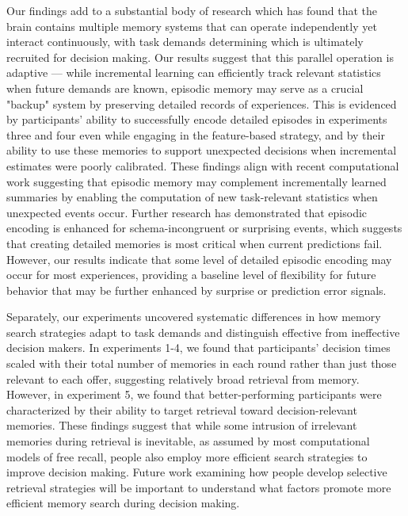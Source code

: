 \documentclass[10pt,letterpaper]{article}
\begin{document}
Our findings add to a substantial body of research which has found that the brain contains multiple memory systems that can operate independently yet interact continuously\cite{packardInactivationHippocampusCaudate1996, squireStructureFunctionDeclarative1996, poldrackCompetitionMultipleMemory2003, poldrackInteractiveMemorySystems2001, shohamyHabitsReinforcementLearning2014, montaser-kouhsariTwoRoutesValuebased2024}, with task demands determining which is ultimately recruited for decision making\cite{dawUncertaintybasedCompetitionPrefrontal2005, nicholasUncertaintyAltersBalance2022, leeNeuralComputationsUnderlying2014}. Our results suggest that this parallel operation is adaptive --- while incremental learning can efficiently track relevant statistics when future demands are known, episodic memory may serve as a crucial "backup" system by preserving detailed records of experiences. This is evidenced by participants' ability to successfully encode detailed episodes in experiments three and four even while engaging in the feature-based strategy, and by their ability to use these memories to support unexpected decisions when incremental estimates were poorly calibrated. These findings align with recent computational work\cite{nagyInterplayEpisodicSemantic2025} suggesting that episodic memory may complement incrementally learned summaries by enabling the computation of new task-relevant statistics when unexpected events occur. Further research has demonstrated that episodic encoding is enhanced for schema-incongruent or surprising events\cite{greveKnowledgePowerPrior2019, vankesterenHowSchemaNovelty2012}, which suggests that creating detailed memories is most critical when current predictions fail. However, our results indicate that some level of detailed episodic encoding may occur for most experiences, providing a baseline level of flexibility for future behavior that may be further enhanced by surprise or prediction error signals\cite{rouhaniSignedUnsignedReward2021, jangPositiveRewardPrediction2019}.

Separately, our experiments uncovered systematic differences in how memory search strategies adapt to task demands and distinguish effective from ineffective decision makers. In experiments 1-4, we found that participants' decision times scaled with their total number of memories in each round rather than just those relevant to each offer, suggesting relatively broad retrieval from memory. However, in experiment 5, we found that better-performing participants were characterized by their ability to target retrieval toward decision-relevant memories. These findings suggest that while some intrusion of irrelevant memories during retrieval is inevitable, as assumed by most computational models of free recall\cite{kahanaFoundationsHumanMemory2012}, people also employ more efficient search strategies to improve decision making. Future work examining how people develop selective retrieval strategies will be important to understand what factors promote more efficient memory search during decision making.
\end{document}
